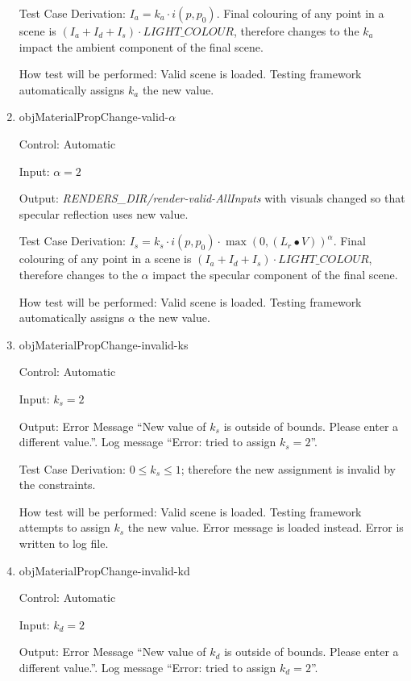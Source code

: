 \documentclass[12pt, titlepage]{article}
\begin{document}
\begin{enumerate}
	Test Case Derivation: $I_{a} = k_{a}\cdot i(p,p_{0})$. Final colouring of 
	any point in a scene is $(I_{a}+I_{d}+I_{s})\cdot LIGHT\_COLOUR$, therefore 
	changes to the $k_{a}$ impact the ambient component of the final scene.
	
	How test will be performed: Valid scene is loaded. Testing framework 
	automatically assigns $k_{a}$ the new value. 

	\item{objMaterialPropChange-valid-$\alpha$\\}
	
	Control: Automatic
	
	Input: $\alpha = 2$
	
	Output: \textit{RENDERS\_DIR/render-valid-AllInputs} with visuals changed 
	so that specular reflection uses new value.
	
	Test Case Derivation: $I_{s} = k_{s}\cdot i(p,p_{0}) \cdot \max(0, 
	({L_{r}}\bullet V))^\alpha$. Final colouring of any point in a scene is 
	$(I_{a}+I_{d}+I_{s})\cdot LIGHT\_COLOUR$, therefore changes to the $\alpha$ 
	impact the specular component of the final scene.
	
	How test will be performed: Valid scene is loaded. Testing framework 
	automatically assigns $\alpha$ the new value. 

	\item{objMaterialPropChange-invalid-ks\\}
	
	Control: Automatic
	
	Input: $k_{s} = 2$
	
	Output: Error Message ``New value of $k_{s}$ is outside of bounds. Please 
	enter a different value.''. Log message ``Error: tried to assign $k_{s} = 
	2$''. 
	
	Test Case Derivation: $0 \le k_{s} \le 1$; therefore the new assignment is 
	invalid by the constraints.
	
	How test will be performed: Valid scene is loaded. Testing framework 
	attempts to assign $k_{s}$ the new value. Error message is loaded instead. 
	Error is written to log file.
	
	\item{objMaterialPropChange-invalid-kd\\}
	
	Control: Automatic
	
	Input: $k_{d} = 2$
	
	Output: Error Message ``New value of $k_{d}$ is outside of bounds. Please 
	enter a different value.''. Log message ``Error: tried to assign $k_{d} = 
	2$''. 
	

\end{enumerate}
\end{document}
